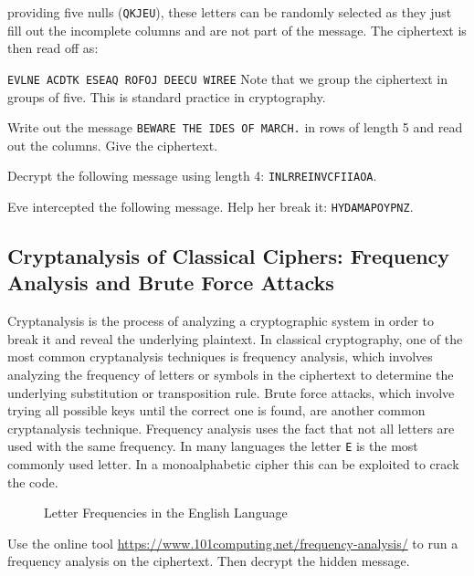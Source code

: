 \documentclass[11pt,a4paper]{report}
\begin{document}
providing five nulls (\verb|QKJEU|), these letters can be randomly selected as they just fill out the incomplete columns and are not part of the message.
The ciphertext is then read off as:

\verb|EVLNE ACDTK ESEAQ ROFOJ DEECU WIREE|
Note that  we group the ciphertext in groups of five. This is standard practice in cryptography.
\begin{ex}
Write out the message
\verb|BEWARE THE IDES OF MARCH.|
in rows of length 5 and read out the columns.
Give the ciphertext.
\end{ex}

\begin{ex}
Decrypt the following message using length 4: \verb|INLRREINVCFIIAOA|.
\end{ex}

\begin{ex}
Eve intercepted the following message. Help her break it: \verb|HYDAMAPOYPNZ|.
\end{ex}




\subsection{Cryptanalysis of Classical Ciphers: Frequency Analysis and Brute Force Attacks}

Cryptanalysis is the process of analyzing a cryptographic system in order to break it and reveal the underlying plaintext.
In classical cryptography, one of the most common cryptanalysis techniques is frequency analysis, which involves analyzing the frequency of letters or symbols in the ciphertext to determine the underlying substitution or transposition rule.
Brute force attacks, which involve trying all possible keys until the correct one is found, are another common cryptanalysis technique.
Frequency analysis uses the fact that not all letters are used with the same frequency.
In many languages the letter \verb|E| is the most commonly used letter.
In a monoalphabetic cipher this can be exploited to crack the code.
\begin{figure}[h]
\caption{Letter Frequencies in the English Language}
\end{figure}

\begin{ex}
Use the online tool \url{https://www.101computing.net/frequency-analysis/} to run a frequency analysis on the ciphertext.
Then decrypt the hidden message.
\end{ex}
\end{document}
